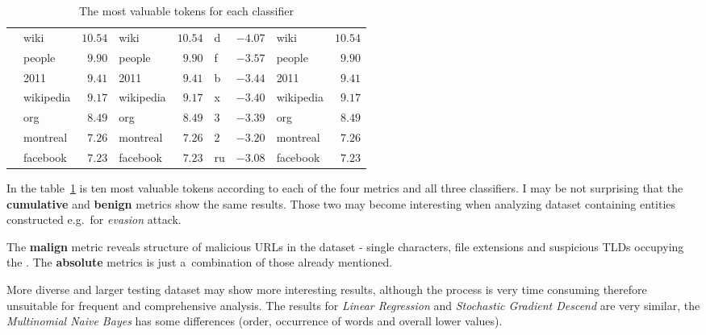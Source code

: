 \begin{table}[htb]
\begin{tabular}{llrlrlrlr}
                                & wiki      & \( 10.54 \)           & wiki      & \( 10.54 \)       & d        & \( -4.07 \)        & wiki      & \( 10.54 \)       \\
                                & people    & \( 9.90 \)            & people    & \( 9.90 \)        & f        & \( -3.57 \)        & people    & \( 9.90 \)        \\
                                & 2011      & \( 9.41 \)            & 2011      & \( 9.41 \)        & b        & \( -3.44 \)        & 2011      & \( 9.41 \)        \\
                                & wikipedia & \( 9.17 \)            & wikipedia & \( 9.17 \)        & x        & \( -3.40 \)        & wikipedia & \( 9.17 \)        \\
                                & org       & \( 8.49 \)            & org       & \( 8.49 \)        & 3        & \( -3.39 \)        & org       & \( 8.49 \)        \\
                                & montreal  & \( 7.26 \)            & montreal  & \( 7.26 \)        & 2        & \( -3.20 \)        & montreal  & \( 7.26 \)        \\
                                & facebook  & \( 7.23 \)            & facebook  & \( 7.23 \)        & ru       & \( -3.08 \)        & facebook  & \( 7.23 \)        \\
        \bottomrule
    \end{tabular}

    \caption{The most valuable tokens for each classifier}
    \label{table:explanations-statistics}
\end{table}
\FloatBarrier

In the table~\ref{table:explanations-statistics} is ten most valuable tokens according to each of the four metrics and all three classifiers.
I may be not surprising that the \textbf{cumulative} and \textbf{benign} metrics show the same results.
Those two may become interesting when analyzing dataset containing entities constructed e.g.\ for \textit{evasion} attack.

The \textbf{malign} metric reveals structure of malicious URLs in the dataset - single characters, file extensions and suspicious TLDs occupying the .
The \textbf{absolute} metrics is just a~combination of those already mentioned.

More diverse and larger testing dataset may show more interesting results, although the process is very time consuming therefore unsuitable for frequent and comprehensive analysis.
The results for \textit{Linear Regression} and \textit{Stochastic Gradient Descend} are very similar, the \textit{Multinomial Naive Bayes} has some differences (order, occurrence of words and overall lower values).

